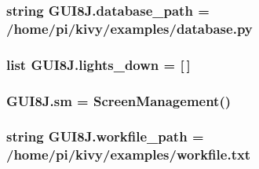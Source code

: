 \subsubsection[{\texorpdfstring{database\+\_\+path}{database_path}}]{\setlength{\rightskip}{0pt plus 5cm}string G\+U\+I8\+J.\+database\+\_\+path = \textquotesingle{}/home/pi/kivy/examples/database.\+py\textquotesingle{}}\hypertarget{namespaceGUI8J_a449cfb95e6ef7bad59eca585bbdbc070}{}\label{namespaceGUI8J_a449cfb95e6ef7bad59eca585bbdbc070}
\subsubsection[{\texorpdfstring{lights\+\_\+down}{lights_down}}]{\setlength{\rightskip}{0pt plus 5cm}list G\+U\+I8\+J.\+lights\+\_\+down = \mbox{[}$\,$\mbox{]}}\hypertarget{namespaceGUI8J_a974cb7ffd4fb84577faa81105a676fe6}{}\label{namespaceGUI8J_a974cb7ffd4fb84577faa81105a676fe6}
\subsubsection[{\texorpdfstring{sm}{sm}}]{\setlength{\rightskip}{0pt plus 5cm}G\+U\+I8\+J.\+sm = {\bf Screen\+Management}()}\hypertarget{namespaceGUI8J_adcbadd2e4d3eb82dc0f961f439e9b394}{}\label{namespaceGUI8J_adcbadd2e4d3eb82dc0f961f439e9b394}
\subsubsection[{\texorpdfstring{workfile\+\_\+path}{workfile_path}}]{\setlength{\rightskip}{0pt plus 5cm}string G\+U\+I8\+J.\+workfile\+\_\+path = \textquotesingle{}/home/pi/kivy/examples/workfile.\+txt\textquotesingle{}}\hypertarget{namespaceGUI8J_a6c128a58943c04cd4b39ab866e932cb5}{}\label{namespaceGUI8J_a6c128a58943c04cd4b39ab866e932cb5}
